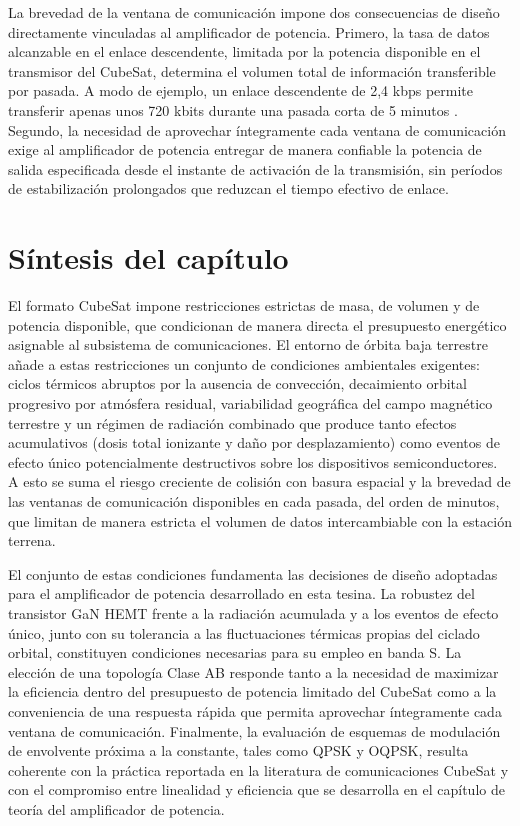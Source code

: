 La brevedad de la ventana de comunicación impone dos consecuencias de diseño directamente vinculadas al amplificador de potencia. Primero, la tasa de datos alcanzable en el enlace descendente, limitada por la potencia disponible en el transmisor del CubeSat, determina el volumen total de información transferible por pasada. A modo de ejemplo, un enlace descendente de 2,4 kbps permite transferir apenas unos 720 kbits durante una pasada corta de 5 minutos \cite{popescu2017}. Segundo, la necesidad de aprovechar íntegramente cada ventana de comunicación exige al amplificador de potencia entregar de manera confiable la potencia de salida especificada desde el instante de activación de la transmisión, sin períodos de estabilización prolongados que reduzcan el tiempo efectivo de enlace.

\section{Síntesis del capítulo}
El formato CubeSat impone restricciones estrictas de masa, de volumen y de potencia disponible, que condicionan de manera directa el presupuesto energético asignable al subsistema de comunicaciones. El entorno de órbita baja terrestre añade a estas restricciones un conjunto de condiciones ambientales exigentes: ciclos térmicos abruptos por la ausencia de convección, decaimiento orbital progresivo por atmósfera residual, variabilidad geográfica del campo magnético terrestre y un régimen de radiación combinado que produce tanto efectos acumulativos (dosis total ionizante y daño por desplazamiento) como eventos de efecto único potencialmente destructivos sobre los dispositivos semiconductores. A esto se suma el riesgo creciente de colisión con basura espacial y la brevedad de las ventanas de comunicación disponibles en cada pasada, del orden de minutos, que limitan de manera estricta el volumen de datos intercambiable con la estación terrena.

El conjunto de estas condiciones fundamenta las decisiones de diseño adoptadas para el amplificador de potencia desarrollado en esta tesina. La robustez del transistor GaN HEMT frente a la radiación acumulada y a los eventos de efecto único, junto con su tolerancia a las fluctuaciones térmicas propias del ciclado orbital, constituyen condiciones necesarias para su empleo en banda S. La elección de una topología Clase AB responde tanto a la necesidad de maximizar la eficiencia dentro del presupuesto de potencia limitado del CubeSat como a la conveniencia de una respuesta rápida que permita aprovechar íntegramente cada ventana de comunicación. Finalmente, la evaluación de esquemas de modulación de envolvente próxima a la constante, tales como QPSK y OQPSK, resulta coherente con la práctica reportada en la literatura de comunicaciones CubeSat y con el compromiso entre linealidad y eficiencia que se desarrolla en el capítulo de teoría del amplificador de potencia.